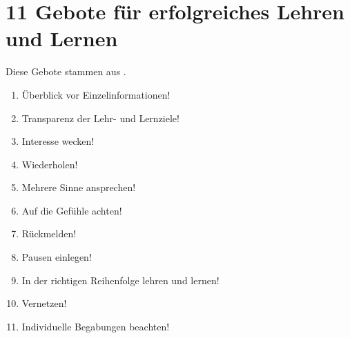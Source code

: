 \section{11 Gebote für erfolgreiches Lehren und Lernen}
\label{lerngebote}

Diese Gebote stammen aus \cite{kopf}.

\begin{enumerate}
    \item Überblick vor Einzelinformationen!
    \item Transparenz der Lehr- und Lernziele!
    \item Interesse wecken!
    \item Wiederholen!
    \item Mehrere Sinne ansprechen!
    \item Auf die Gefühle achten!
    \item Rückmelden!
    \item Pausen einlegen!
    \item In der richtigen Reihenfolge lehren und lernen!
    \item Vernetzen!
    \item Individuelle Begabungen beachten!
\end{enumerate}
